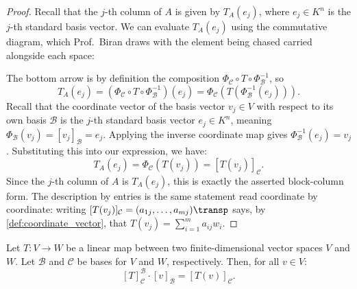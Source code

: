 \begin{proof}
Recall that the $j$-th column of $A$ is given by $T_A(e_j)$, where $e_j \in K^n$ is the $j$-th standard basis vector. We can evaluate $T_A(e_j)$ using the commutative diagram, which Prof.~Biran draws with the element being chased carried alongside each space:

\begin{center}
\end{center}

The bottom arrow is by definition the composition $\Phi_{\mathcal{C}} \circ T \circ \Phi_{\mathcal{B}}^{-1}$, so
\[
T_A(e_j) = \left( \Phi_{\mathcal{C}} \circ T \circ \Phi_{\mathcal{B}}^{-1} \right)(e_j) = \Phi_{\mathcal{C}}\left( T\left( \Phi_{\mathcal{B}}^{-1}(e_j) \right) \right).
\]
Recall that the coordinate vector of the basis vector $v_j \in V$ with respect to its own basis $\mathcal{B}$ is the $j$-th standard basis vector $e_j \in K^n$, meaning $\Phi_{\mathcal{B}}(v_j) = [v_j]_{\mathcal{B}} = e_j$. Applying the inverse coordinate map gives $\Phi_{\mathcal{B}}^{-1}(e_j) = v_j$. Substituting this into our expression, we have:
\[
T_A(e_j) = \Phi_{\mathcal{C}}(T(v_j)) = [T(v_j)]_{\mathcal{C}}.
\]
Since the $j$-th column of $A$ is $T_A(e_j)$, this is exactly the asserted block-column form. The description by entries is the same statement read coordinate by coordinate: writing $[T(v_j)]_{\mathcal{C}} = (a_{1j}, \dots, a_{mj})\transp$ says, by \cref{def:coordinate_vector}, that $T(v_j) = \sum_{i=1}^m a_{ij} w_i$.
\end{proof}

\begin{proposition}
\label{prop:matrix_evaluation}
Let $T: V \to W$ be a linear map between two finite-di\-men\-sional vector spaces $V$ and $W$. Let $\mathcal{B}$ and $\mathcal{C}$ be bases for $V$ and $W$, respectively. Then, for all $v \in V$:
\[
[T]_{\mathcal{C}}^{\mathcal{B}} \cdot [v]_{\mathcal{B}} = [T(v)]_{\mathcal{C}}.
\]
\end{proposition}

